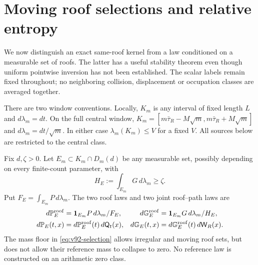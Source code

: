 \section{Moving roof selections and relative entropy}
\label{sec:v92-entropy}
We now distinguish an exact same-roof kernel from a law conditioned
on a measurable set of roofs. The latter has a useful stability theorem
even though uniform pointwise inversion has not been established.
The scalar labels remain fixed throughout; no neighboring collision,
displacement or occupation classes are averaged together.

There are two window conventions. Locally, $K_m$ is any interval of
fixed length $L$ and $d\lambda_m=dt$. On the full central window,
$K_m=[m\bar\tau_R-M\sqrt m,m\bar\tau_R+M\sqrt m]$ and
$d\lambda_m=dt/\sqrt m$. In either case $\lambda_m(K_m)\le V$ for
a fixed $V$. All sources below are restricted to the central class.

Fix $d,\zeta>0$. Let $E_m\subset K_m\cap D_m(d)$ be any measurable
set, possibly depending on every finite-count parameter, with
\begin{equation}\label{eq:v92-selection}
 H_E:=\int_{E_m}G\,d\lambda_m\ge\zeta.
\end{equation}
Put $F_E=\int_{E_m}P\,d\lambda_m$. The two roof laws and two joint
roof--path laws are
\begin{align*}
 d\mathbb P_E^{\rm roof}&=\mathbf1_{E_m}P\,d\lambda_m/F_E,
 &d\mathbb G_E^{\rm roof}&=\mathbf1_{E_m}G\,d\lambda_m/H_E,\\
 d\mathbb P_E(t,x)&=d\mathbb P_E^{\rm roof}(t)\,d\mathsf Q_t(x),
 &d\mathbb G_E(t,x)&=d\mathbb G_E^{\rm roof}(t)\,d\mathsf W_R(x).
\end{align*}
The mass floor in \eqref{eq:v92-selection} allows irregular and moving
roof sets, but does not allow their reference mass to collapse to zero.
No reference law is constructed on an arithmetic zero class.


